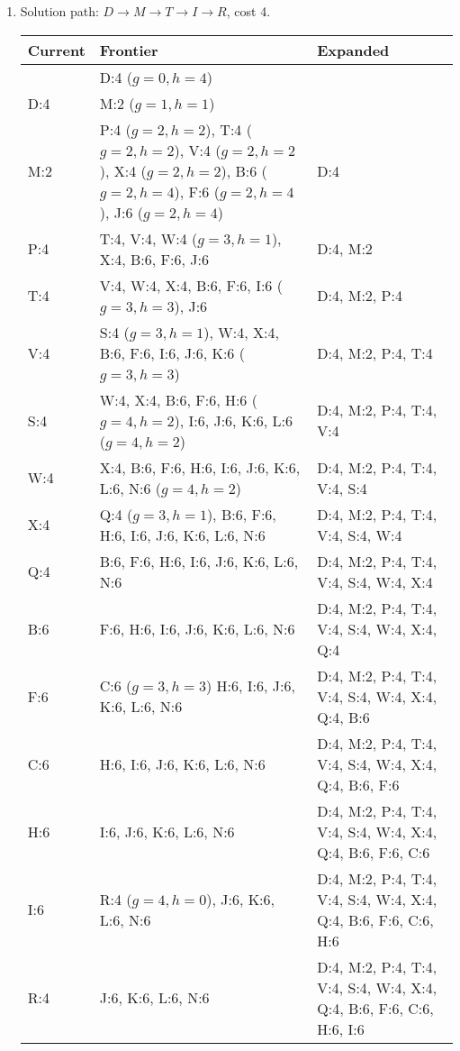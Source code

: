 \documentclass{article}
\begin{document}
\begin{enumerate}
\begin{enumerate}
        \item Solution path: $D{\rightarrow}M{\rightarrow}T{\rightarrow}I{\rightarrow}R$, cost 4.\\
            \begin{tabular}{|l|p{6cm}|p{7.5cm}|}
                \hline
                    Current & Frontier & Expanded \\\hline\hline
                        & D:4 ($g=0, h=4$) & \\\hline
                    D:4 & M:2 ($g=1, h=1$) & \\\hline
                    M:2 & P:4 ($g=2, h=2$), T:4 ($g=2, h=2$), V:4 ($g=2, h=2$), X:4 ($g=2, h=2$), B:6 ($g=2, h=4$), F:6 ($g=2, h=4$), J:6 ($g=2, h=4$) & D:4 \\\hline
                    P:4 & T:4, V:4, W:4 ($g=3, h=1$), X:4, B:6, F:6, J:6 & D:4, M:2 \\\hline
                    T:4 & V:4, W:4, X:4, B:6, F:6, I:6 ($g=3, h=3$), J:6 & D:4, M:2, P:4\\\hline
                    V:4 & S:4 ($g=3, h=1$), W:4, X:4, B:6, F:6, I:6, J:6, K:6 ($g=3, h=3$) & D:4, M:2, P:4, T:4\\\hline
                    S:4 & W:4, X:4, B:6, F:6, H:6 ($g=4, h=2$), I:6, J:6, K:6, L:6 ($g=4, h=2$) & D:4, M:2, P:4, T:4, V:4\\\hline
                    W:4 & X:4, B:6, F:6, H:6, I:6, J:6, K:6, L:6, N:6 ($g=4, h=2$) & D:4, M:2, P:4, T:4, V:4, S:4\\\hline
                    X:4 & Q:4 ($g=3, h=1$), B:6, F:6, H:6, I:6, J:6, K:6, L:6, N:6 & D:4, M:2, P:4, T:4, V:4, S:4, W:4\\\hline
                    Q:4 & B:6, F:6, H:6, I:6, J:6, K:6, L:6, N:6 & D:4, M:2, P:4, T:4, V:4, S:4, W:4, X:4\\\hline
                    B:6 & F:6, H:6, I:6, J:6, K:6, L:6, N:6 & D:4, M:2, P:4, T:4, V:4, S:4, W:4, X:4, Q:4\\\hline
                    F:6 & C:6 ($g=3, h=3$) H:6, I:6, J:6, K:6, L:6, N:6 & D:4, M:2, P:4, T:4, V:4, S:4, W:4, X:4, Q:4, B:6\\\hline
                    C:6 & H:6, I:6, J:6, K:6, L:6, N:6 & D:4, M:2, P:4, T:4, V:4, S:4, W:4, X:4, Q:4, B:6, F:6\\\hline
                    H:6 & I:6, J:6, K:6, L:6, N:6 & D:4, M:2, P:4, T:4, V:4, S:4, W:4, X:4, Q:4, B:6, F:6, C:6\\\hline
                    I:6 & R:4 ($g=4, h=0$), J:6, K:6, L:6, N:6 & D:4, M:2, P:4, T:4, V:4, S:4, W:4, X:4, Q:4, B:6, F:6, C:6, H:6\\\hline
                    R:4 & J:6, K:6, L:6, N:6 & D:4, M:2, P:4, T:4, V:4, S:4, W:4, X:4, Q:4, B:6, F:6, C:6, H:6, I:6\\
                \hline
            \end{tabular}
    \end{enumerate}
\end{enumerate}
\end{document}
